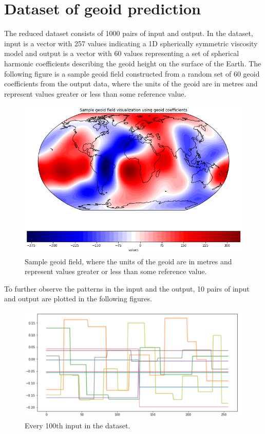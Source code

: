 \section{Dataset of geoid prediction}

The reduced dataset consists of 1000 pairs of input and output. In the dataset, input is a vector with 257 values indicating a 1D spherically symmetric viscosity model and output is a vector with 60 values representing a set of spherical harmonic coefficients describing the geoid height on the surface of the Earth. The following figure is a sample geoid field constructed from a random set of 60 geoid coefficients from the output data, where the units of the geoid are in metres and represent values greater or less than some reference value.

\begin{figure}[H]
    \caption{Sample geoid field, where the units of the geoid are in metres and represent values greater or less than some reference value.}
    \includegraphics[scale=0.6]{figures/geoid_images/Geoid_Sample_visualization.png}
\end{figure}

To further observe the patterns in the input and the output, 10 pairs of input and output are plotted in the following figures.

\begin{figure}[H]
    \caption{Every 100th input in the dataset.}
    \includegraphics[scale=0.6]{figures/geoid_images/Geoid_sample_input.png}
\end{figure}

